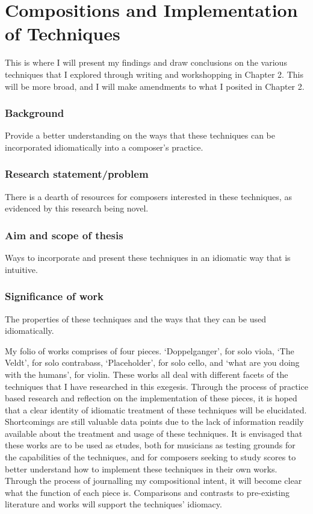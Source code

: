 

\chapter{Compositions and Implementation of Techniques}
This is where I will present my findings and draw conclusions on the various techniques that I explored through writing and workshopping in Chapter 2. This will be more broad, and I will make amendments to what I posited in Chapter 2. \lipsum[5]
\subsection{Background}
Provide a better understanding on the ways that these techniques can be incorporated idiomatically into a composer's practice.

\subsection{Research statement/problem}
There is a dearth of resources for composers interested in these techniques, as evidenced by this research being novel.

\subsection{Aim and scope of thesis}
Ways to incorporate and present these techniques in an idiomatic way that is intuitive.

\subsection{Significance of work}
The properties of these techniques and the ways that they can be used idiomatically.


\lipsum[4]

My folio of works comprises of four pieces. `Doppelganger', for solo viola, `The Veldt', for solo contrabass, `Placeholder', for solo cello, and `what are you doing with the humans', for violin. 
These works all deal with different facets of the techniques that I have researched in this exegesis. 
Through the process of practice based research and reflection on the implementation of these pieces, it is hoped that a clear identity of idiomatic treatment of these techniques will be elucidated.
Shortcomings are still valuable data points due to the lack of information readily available about the treatment and usage of these techniques.
It is envisaged that these works are to be used as etudes, both for musicians as testing grounds for the capabilities of the techniques, and for composers seeking to study scores to better understand how to implement these techniques in their own works.
Through the process of journalling my compositional intent, it will become clear what the function of each piece is.
Comparisons and contrasts to pre-existing literature and works will support the techniques' idiomacy. 


